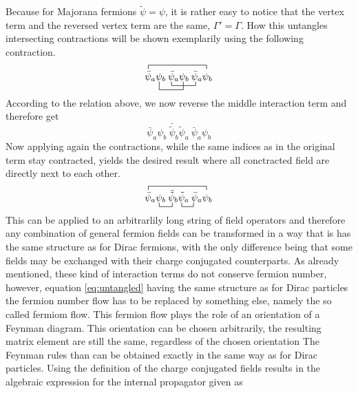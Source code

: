 Because for Majorana fermions $\tilde{\psi}=\psi$, it is rather easy to notice that the vertex term and the reversed vertex term are the same, $\Gamma'=\Gamma$. \newline
How this untangles intersecting contractions will be shown exemplarily using the following contraction.
\begin{equation*}
	\contraction{}{\bar{\psi}}{{_a\psi_b\:\bar{\psi}_a\psi_b\:\bar{\psi}_a}}{\psi}
	\bcontraction[2ex]{\bar{\psi}_a}{\psi}{{}_b\:\bar{\psi}_a}{\psi}
	\bcontraction{\bar{\psi}_a\psi_b\:}{\bar{\psi}}{{}_a\psi_b\:}{\bar{\psi}}
	\bar{\psi}_a\psi_b\:\bar{\psi}_a\psi_b\:\bar{\psi}_a\psi_b
\end{equation*}
According to the relation above, we now reverse the middle interaction term and therefore get
\begin{equation*}
	\bar{\psi}_a\psi_b\:\bar{\tilde{\psi}}_b\tilde{\psi}_a\:\bar{\psi}_a\psi_b
\end{equation*}
Now applying again the contractions, while the same indices as in the original term stay contracted, yields the desired result where all conctracted field are directly next to each other. 
\begin{equation}
\contraction{}{\bar{\psi}}{{_a\psi_b\:\bar{\psi}_a\psi_b\:\bar{\psi}_a}}{\psi}
\bcontraction{\bar{\psi}_a}{\psi}{{}_b\:}{\psi}
\bcontraction{\bar{\psi}_a\psi_b\:\bar{\tilde{\psi}}_b}{\bar{\psi}}{{}_a}{\bar{\psi}}
\bar{\psi}_a\psi_b\:\bar{\tilde{\psi}}_b\tilde{\psi}_a\:\bar{\psi}_a\psi_b
\label{eq:untangled}
\end{equation}
This can be applied to an arbitrarlily long string of field operators and therefore any combination of general fermion fields can be transformed in a way that is has the same structure as for Dirac fermions, with the only difference being that some fields may be exchanged with their charge conjugated counterparts. As already mentioned, these kind of interaction terms do not conserve fermion number, however, equation \ref{eq:untangled} having the same structure as for Dirac particles the fermion number flow has to be replaced by something else, namely the so called fermiom flow. This fermion flow plays the role of an orientation of a Feynman diagram. This orientation can be chosen arbitrarily, the resulting matrix element are still the same, regardless of the chosen orientation\newline 
The Feynman rules than can be obtained exactly in the same way as for Dirac particles. Using the definition of the charge conjugated fields results in the algebraic expression for the internal propagator given as

